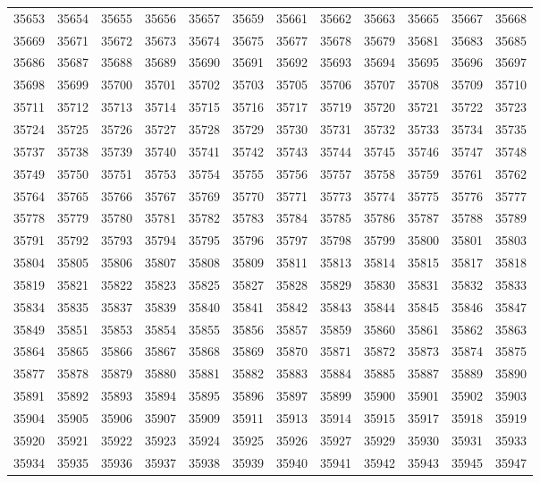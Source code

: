 \begin{center}
\begin{longtable}{llllllllllll}
35653 &35654 &35655 &35656 &35657 &35659 &35661 &35662 &35663 &35665 &35667 &35668 \\
35669 &35671 &35672 &35673 &35674 &35675 &35677 &35678 &35679 &35681 &35683 &35685 \\
35686 &35687 &35688 &35689 &35690 &35691 &35692 &35693 &35694 &35695 &35696 &35697 \\
35698 &35699 &35700 &35701 &35702 &35703 &35705 &35706 &35707 &35708 &35709 &35710 \\
35711 &35712 &35713 &35714 &35715 &35716 &35717 &35719 &35720 &35721 &35722 &35723 \\
35724 &35725 &35726 &35727 &35728 &35729 &35730 &35731 &35732 &35733 &35734 &35735 \\
35737 &35738 &35739 &35740 &35741 &35742 &35743 &35744 &35745 &35746 &35747 &35748 \\
35749 &35750 &35751 &35753 &35754 &35755 &35756 &35757 &35758 &35759 &35761 &35762 \\
35764 &35765 &35766 &35767 &35769 &35770 &35771 &35773 &35774 &35775 &35776 &35777 \\
35778 &35779 &35780 &35781 &35782 &35783 &35784 &35785 &35786 &35787 &35788 &35789 \\
35791 &35792 &35793 &35794 &35795 &35796 &35797 &35798 &35799 &35800 &35801 &35803 \\
35804 &35805 &35806 &35807 &35808 &35809 &35811 &35813 &35814 &35815 &35817 &35818 \\
35819 &35821 &35822 &35823 &35825 &35827 &35828 &35829 &35830 &35831 &35832 &35833 \\
35834 &35835 &35837 &35839 &35840 &35841 &35842 &35843 &35844 &35845 &35846 &35847 \\
35849 &35851 &35853 &35854 &35855 &35856 &35857 &35859 &35860 &35861 &35862 &35863 \\
35864 &35865 &35866 &35867 &35868 &35869 &35870 &35871 &35872 &35873 &35874 &35875 \\
35877 &35878 &35879 &35880 &35881 &35882 &35883 &35884 &35885 &35887 &35889 &35890 \\
35891 &35892 &35893 &35894 &35895 &35896 &35897 &35899 &35900 &35901 &35902 &35903 \\
35904 &35905 &35906 &35907 &35909 &35911 &35913 &35914 &35915 &35917 &35918 &35919 \\
35920 &35921 &35922 &35923 &35924 &35925 &35926 &35927 &35929 &35930 &35931 &35933 \\
35934 &35935 &35936 &35937 &35938 &35939 &35940 &35941 &35942 &35943 &35945 &35947 \\

\end{longtable}
\end{center}
